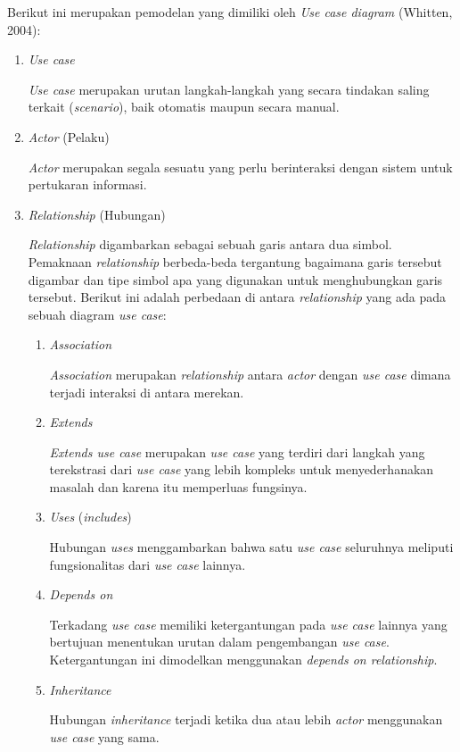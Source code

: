     Berikut ini merupakan pemodelan yang dimiliki oleh \emph{Use case diagram} (Whitten, 2004): \newline
    \begin{enumerate}
      \itemsep0em
      \item \emph{Use case}
      
      \emph{Use case} merupakan urutan langkah-langkah yang secara tindakan saling terkait (\emph{scenario}), baik otomatis maupun secara manual.
      \item \emph{Actor} (Pelaku)
      
      \emph{Actor} merupakan segala sesuatu yang perlu berinteraksi dengan sistem untuk pertukaran informasi.
      \item \emph{Relationship} (Hubungan)
      
      \emph{Relationship} digambarkan sebagai sebuah garis antara dua simbol. Pemaknaan \emph{relationship} berbeda-beda tergantung bagaimana garis tersebut digambar dan tipe simbol apa yang digunakan untuk menghubungkan garis tersebut. Berikut ini adalah perbedaan di antara \emph{relationship} yang ada pada sebuah diagram \emph{use case}:
        \begin{enumerate}[label=\alph*.]
          \itemsep0em
          \item \emph{Association}
          
          \emph{Association} merupakan \emph{relationship} antara \emph{actor} dengan \emph{use case} dimana terjadi interaksi di antara merekan.
          \item \emph{Extends}
          
          \emph{Extends use case} merupakan \emph{use case} yang terdiri dari langkah yang terekstrasi dari \emph{use case} yang lebih kompleks untuk menyederhanakan masalah dan karena itu memperluas fungsinya.
          \item \emph{Uses} (\emph{includes})
          
          Hubungan \emph{uses} menggambarkan bahwa satu \emph{use case} seluruhnya meliputi fungsionalitas dari \emph{use case} lainnya.
          \item \emph{Depends on}
          
          Terkadang \emph{use case} memiliki ketergantungan pada \emph{use case} lainnya yang bertujuan menentukan urutan dalam pengembangan \emph{use case}. Ketergantungan ini dimodelkan menggunakan \emph{depends on relationship}.
          \item \emph{Inheritance}
          
          Hubungan \emph{inheritance} terjadi ketika dua atau lebih \emph{actor} menggunakan \emph{use case} yang sama.
        \end{enumerate}
    \end{enumerate}

